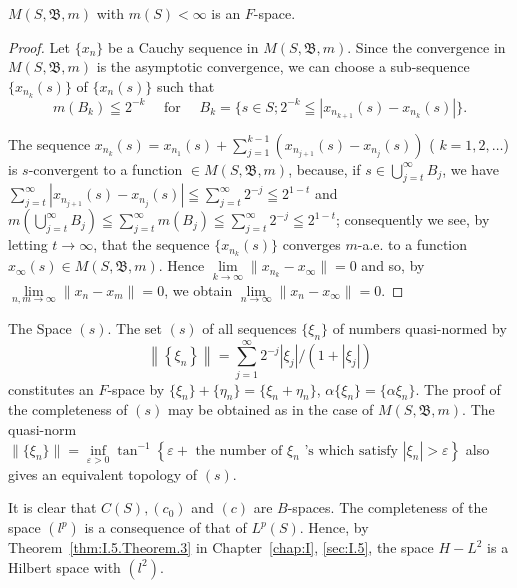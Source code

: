\begin{proposition}\label{prop:I.9.Proposition.4} $M(S, \mathfrak{B}, m)$ with $m(S) < \infty$ is an $F$-space. 
\end{proposition}

\begin{proof}
 Let $\{x_{n}\}$ be a Cauchy sequence in $M(S, \mathfrak{B}, m)$. Since the convergence in $M(S, \mathfrak{B}, m)$ is the asymptotic convergence, we can choose a sub-sequence $\{x_{n_{k}}(s)\}$ of $\{x_{n}(s)\}$ such that 
\[
m \left(B_{k}\right) \leqq 2 ^{-k} \quad \text{ for } \quad B_{k} = \{s \in S; 2 ^{-k} \leqq \left| x_ {n_{k+1}} (s)- x_ {n_{k}} (s) \right| \}. \]

The sequence $x_{n_{k}}(s) = x_{n_1}(s) + \sum\limits_{j=1}^{k-1} (x_{n_{j+1}}(s)- x_{n_{j}}(s))$ ( $k = 1, 2, \ldots$) is $s$-convergent to a function $\in M(S, \mathfrak{B}, m)$, because, if $s \in \bigcup\limits_{j=t}^{\infty} B_j$, we have $\sum\limits_{j=t}^{\infty} |x_{n_{j+1}}(s)- x_{n_{j}}(s)| \leqq \sum\limits_{j=t}^{\infty} 2^{-j} \leqq 2^{1-t}$ and $m\left(\bigcup\limits_{j=t}^{\infty} B_j\right) \leqq \sum\limits_{j=t}^{\infty} m(B_j) \leqq \sum\limits_{j=t}^{\infty} 2^{-j} \leqq 2^{1-t}$; consequently we see, by letting $t \to \infty$, that the sequence $\{x_{n_{k}}(s)\}$ converges $m$-a.e. to a function $x_\infty(s) \in M(S, \mathfrak{B}, m)$. Hence $\lim\limits_{k \to \infty} \|x_{n_{k}}- x_\infty\| = 0$ and so, by $\lim\limits_{n, m \to \infty} \|x_n- x_m\| = 0$, we obtain $\lim\limits_{n \to \infty} \|x_n- x_\infty\| = 0$. 
\end{proof}

The Space $(s)$. The set $(s)$ of all sequences $\{\xi_{n}\}$ of numbers quasi-normed by 
\[
\left\| \left\{\xi_{n} \right\} \right\| = \sum\limits_{j=1} ^{\infty} 2 ^{-j} \left| \xi_{j} \right| / (1 + \left| \xi_{j} \right|)
\]
constitutes an $F$-space by $\{\xi_n\} + \{\eta_n\} = \{\xi_n + \eta_n\}$, $\alpha\{\xi_n\} = \{\alpha\xi_n\}$. The proof of the completeness of $(s)$ may be obtained as in the case of $M(S, \mathfrak{B}, m)$. The quasi-norm 
$\|\{\xi_{n}\}\|=\inf\limits_{\varepsilon>0}\tan^{-1}\left\{\varepsilon+\text{ the number of }\xi_{n}\text{ 's which satisfy }|\xi_{n}|>\varepsilon\right\}$ also gives an equivalent topology of $(s)$. 

\begin{remarku} It is clear that $C(S), (c_0)$ and $(c)$ are $B$-spaces. The completeness of the space $(l^p)$ is a consequence of that of $L^p(S)$. Hence, by Theorem~\ref{thm:I.5.Theorem.3} in Chapter~\ref{chap:I}, \ref{sec:I.5}, the space $H- L^2$ is a Hilbert space with $(l^2)$. 
\end{remarku}

